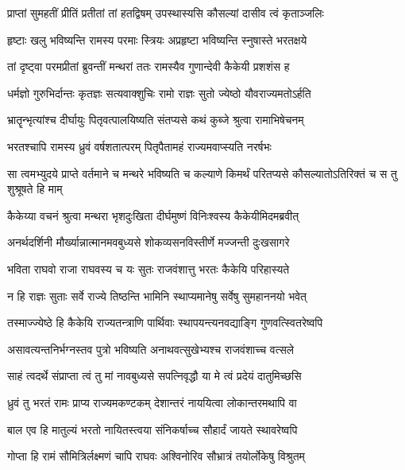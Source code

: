 \twolineshloka
{प्राप्तां सुमहतीं प्रीतिं प्रतीतां तां हतद्विषम्}
{उपस्थास्यसि कौसल्यां दासीव त्वं कृताञ्जलिः} %

\twolineshloka
{हृष्टाः खलु भविष्यन्ति रामस्य परमाः स्त्रियः}
{अप्रहृष्टा भविष्यन्ति स्नुषास्ते भरतक्षये} %

\twolineshloka
{तां दृष्ट्वा परमप्रीतां ब्रुवन्तीं मन्थरां ततः}
{रामस्यैव गुणान्देवी कैकेयी प्रशशंस ह} %

\twolineshloka
{धर्मज्ञो गुरुभिर्दान्तः कृतज्ञः सत्यवाक्शुचिः}
{रामो राज्ञः सुतो ज्येष्ठो यौवराज्यमतोऽर्हति} %

\twolineshloka
{भ्रातॄन्भृत्यांश्च दीर्घायुः पितृवत्पालयिष्यति}
{संतप्यसे कथं कुब्जे श्रुत्वा रामाभिषेचनम्} %

\twolineshloka
{भरतश्चापि रामस्य ध्रुवं वर्षशतात्परम्}
{पितृपैतामहं राज्यमवाप्स्यति नरर्षभः} %

\threelineshloka
{सा त्वमभ्युदये प्राप्ते वर्तमाने च मन्थरे}
{भविष्यति च कल्याणे किमर्थं परितप्यसे}
{कौसल्यातोऽतिरिक्तं च स तु शुश्रूषते हि माम्} %

\twolineshloka
{कैकेय्या वचनं श्रुत्वा मन्थरा भृशदुःखिता}
{दीर्घमुष्णं विनिःश्वस्य कैकेयीमिदमब्रवीत्} %

\twolineshloka
{अनर्थदर्शिनी मौर्ख्यान्नात्मानमवबुध्यसे}
{शोकव्यसनविस्तीर्णे मज्जन्ती दुःखसागरे} %

\twolineshloka
{भविता राघवो राजा राघवस्य च यः सुतः}
{राजवंशात्तु भरतः कैकेयि परिहास्यते} %

\twolineshloka
{न हि राज्ञः सुताः सर्वे राज्ये तिष्ठन्ति भामिनि}
{स्थाप्यमानेषु सर्वेषु सुमहाननयो भवेत्} %

\twolineshloka
{तस्माज्ज्येष्ठे हि कैकेयि राज्यतन्त्राणि पार्थिवाः}
{स्थापयन्त्यनवद्याङ्गि गुणवत्स्वितरेष्वपि} %

\twolineshloka
{असावत्यन्तनिर्भग्नस्तव पुत्रो भविष्यति}
{अनाथवत्सुखेभ्यश्च राजवंशाच्च वत्सले} %

\twolineshloka
{साहं त्वदर्थे संप्राप्ता त्वं तु मां नावबुध्यसे}
{सपत्निवृद्धौ या मे त्वं प्रदेयं दातुमिच्छसि} %

\twolineshloka
{ध्रुवं तु भरतं रामः प्राप्य राज्यमकण्टकम्}
{देशान्तरं नाययित्वा लोकान्तरमथापि वा} %

\twolineshloka
{बाल एव हि मातुल्यं भरतो नायितस्त्वया}
{संनिकर्षाच्च सौहार्दं जायते स्थावरेष्वपि} %

\twolineshloka
{गोप्ता हि रामं सौमित्रिर्लक्ष्मणं चापि राघवः}
{अश्विनोरिव सौभ्रात्रं तयोर्लोकेषु विश्रुतम्} %

